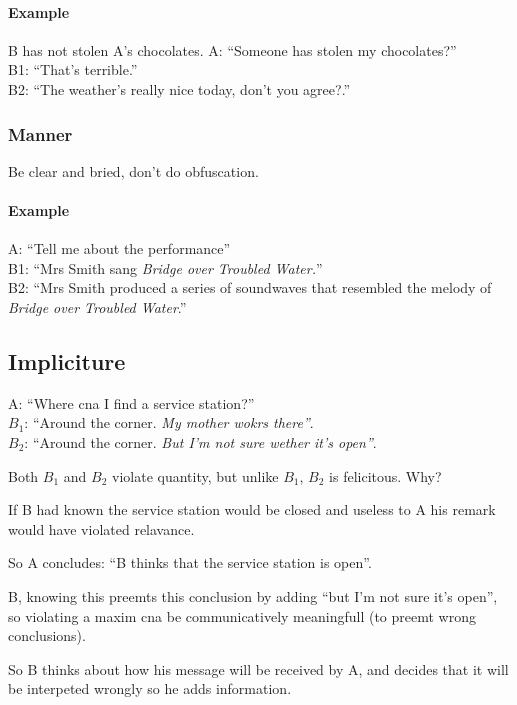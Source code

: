 \documentclass{article}
\begin{document}
\paragraph{Example} B has not stolen A's chocolates.
A: ``Someone has stolen my chocolates?''\\
B1: {\color{green} ``That's terrible.''}\\
B2: {\color{red} ``The weather's really nice today, don't you agree?.''}\\

\subsubsection{Manner}
Be clear and bried, don't do obfuscation.

\paragraph{Example} 
A: ``Tell me about the performance''\\
B1: {\color{green} ``Mrs Smith sang \emph{Bridge over Troubled Water.}''}\\
B2: {\color{red} ``Mrs Smith produced a series of soundwaves that resembled
the melody of \emph{Bridge over Troubled Water}.''}\\

\subsection{Impliciture}
A: ``Where cna I find a service station?''\\
$B_1$: ``Around the corner. \emph{My mother wokrs there''}.\\
$B_2$: ``Around the corner. \emph{But I'm not sure wether it's open''}.

Both $B_1$ and $B_2$ violate quantity, but unlike $B_1$, $B_2$ is 
felicitous. Why?

If B had known the service station would be closed and useless
to A his remark would have violated relavance.

So A concludes: ``B thinks that the service station is open''.

B, knowing this preemts this conclusion by adding ``but I'm not sure it's 
open'', so violating a maxim cna be communicatively meaningfull (to preemt
wrong conclusions).

So B thinks about how his message will be received by A, and decides that
it will be interpeted wrongly so he adds information.
\end{document}
